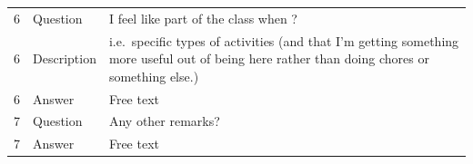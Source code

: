 \documentclass[paper=a4,justified,a4paper]{tufte-handout}
\begin{document}
\begin{longtable}[]{@{}lll@{}}
\begin{minipage}[t]{0.09\columnwidth}\raggedright
6\strut
\end{minipage} & \begin{minipage}[t]{0.14\columnwidth}\raggedright
Question\strut
\end{minipage} & \begin{minipage}[t]{0.68\columnwidth}\raggedright
I feel like part of the class when ?\strut
\end{minipage}\tabularnewline
\begin{minipage}[t]{0.09\columnwidth}\raggedright
6\strut
\end{minipage} & \begin{minipage}[t]{0.14\columnwidth}\raggedright
Description\strut
\end{minipage} & \begin{minipage}[t]{0.68\columnwidth}\raggedright
i.e.~specific types of activities (and that I'm getting something more
useful out of being here rather than doing chores or something
else.)\strut
\end{minipage}\tabularnewline
\begin{minipage}[t]{0.09\columnwidth}\raggedright
6\strut
\end{minipage} & \begin{minipage}[t]{0.14\columnwidth}\raggedright
Answer\strut
\end{minipage} & \begin{minipage}[t]{0.68\columnwidth}\raggedright
Free text\strut
\end{minipage}\tabularnewline
\begin{minipage}[t]{0.09\columnwidth}\raggedright
7\strut
\end{minipage} & \begin{minipage}[t]{0.14\columnwidth}\raggedright
Question\strut
\end{minipage} & \begin{minipage}[t]{0.68\columnwidth}\raggedright
Any other remarks?\strut
\end{minipage}\tabularnewline
\begin{minipage}[t]{0.09\columnwidth}\raggedright
7\strut
\end{minipage} & \begin{minipage}[t]{0.14\columnwidth}\raggedright
Answer\strut
\end{minipage} & \begin{minipage}[t]{0.68\columnwidth}\raggedright
Free text\strut
\end{minipage}\tabularnewline

\end{longtable}
\end{document}
